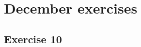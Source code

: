 \documentclass[main.tex]{subfiles}
\begin{document}
\section{December exercises}

\subsection{Exercise 10}
\end{document}
